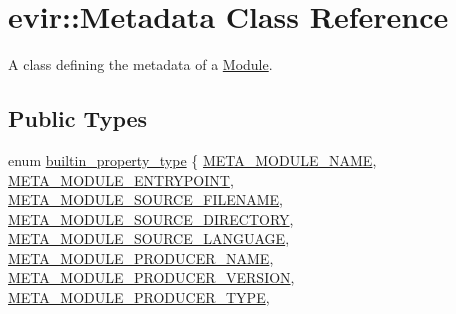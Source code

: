 \hypertarget{classevir_1_1Metadata}{}\section{evir\+:\+:Metadata Class Reference}
\label{classevir_1_1Metadata}


A class defining the metadata of a \hyperlink{classevir_1_1Module}{Module}.  


\subsection*{Public Types}
\begin{DoxyCompactItemize}
\item 
enum \hyperlink{classevir_1_1Metadata_a292423b7a2d93f70382d1da4929f55a0}{builtin\+\_\+property\+\_\+type} \{ \newline
\hyperlink{classevir_1_1Metadata_a292423b7a2d93f70382d1da4929f55a0a043ad4ab5db7545ce1e5f68f392e4a87}{M\+E\+T\+A\+\_\+\+M\+O\+D\+U\+L\+E\+\_\+\+N\+A\+ME}, 
\newline
\hyperlink{classevir_1_1Metadata_a292423b7a2d93f70382d1da4929f55a0a6214ab10011d915c858a295d4fce43a4}{M\+E\+T\+A\+\_\+\+M\+O\+D\+U\+L\+E\+\_\+\+E\+N\+T\+R\+Y\+P\+O\+I\+NT}, 
\newline
\hyperlink{classevir_1_1Metadata_a292423b7a2d93f70382d1da4929f55a0a6a3358b2453de5814fb1303ccdffb0d1}{M\+E\+T\+A\+\_\+\+M\+O\+D\+U\+L\+E\+\_\+\+S\+O\+U\+R\+C\+E\+\_\+\+F\+I\+L\+E\+N\+A\+ME}, 
\newline
\hyperlink{classevir_1_1Metadata_a292423b7a2d93f70382d1da4929f55a0a809beaad6fca6ec64b61a3a32df451c8}{M\+E\+T\+A\+\_\+\+M\+O\+D\+U\+L\+E\+\_\+\+S\+O\+U\+R\+C\+E\+\_\+\+D\+I\+R\+E\+C\+T\+O\+RY}, 
\newline
\hyperlink{classevir_1_1Metadata_a292423b7a2d93f70382d1da4929f55a0a04e7bc9c5d4d56c652abbce665803799}{M\+E\+T\+A\+\_\+\+M\+O\+D\+U\+L\+E\+\_\+\+S\+O\+U\+R\+C\+E\+\_\+\+L\+A\+N\+G\+U\+A\+GE}, 
\newline
\hyperlink{classevir_1_1Metadata_a292423b7a2d93f70382d1da4929f55a0a1d00cd63ff852d8f813396ea650a558d}{M\+E\+T\+A\+\_\+\+M\+O\+D\+U\+L\+E\+\_\+\+P\+R\+O\+D\+U\+C\+E\+R\+\_\+\+N\+A\+ME}, 
\newline
\hyperlink{classevir_1_1Metadata_a292423b7a2d93f70382d1da4929f55a0a233194bfc98afdb26b2842af7b1f8394}{M\+E\+T\+A\+\_\+\+M\+O\+D\+U\+L\+E\+\_\+\+P\+R\+O\+D\+U\+C\+E\+R\+\_\+\+V\+E\+R\+S\+I\+ON}, 
\newline
\hyperlink{classevir_1_1Metadata_a292423b7a2d93f70382d1da4929f55a0a51ab342bdfd6c1b78e0d536832d002fa}{M\+E\+T\+A\+\_\+\+M\+O\+D\+U\+L\+E\+\_\+\+P\+R\+O\+D\+U\+C\+E\+R\+\_\+\+T\+Y\+PE}, 

\end{DoxyCompactItemize}
